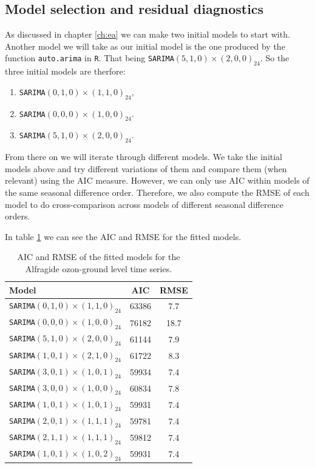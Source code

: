 \documentclass{article}
\begin{document}
\subsection{Model selection and residual diagnostics}

As discussed in chapter \ref{ch:ea} we can make two initial models to start with. Another model we will take as our initial model is the one produced by the function \verb|auto.arima| in \verb|R|. That being 
\verb|SARIMA|$(5,1,0) \times (2,0,0)_{24}$. So the three initial models are therfore:
\begin{enumerate}
    \item \verb|SARIMA|$(0,1,0) \times (1,1,0)_{24}$,
    \item \verb|SARIMA|$(0,0,0) \times (1,0,0)_{24}$.
    \item \verb|SARIMA|$(5,1,0) \times (2,0,0)_{24}$.
\end{enumerate}

From there on we will iterate through different models. We take the initial models above and try different variations of them and compare them (when relevant) using the AIC measure. However, we can only use AIC within models of the same seasonal
difference order. Therefore, we also compute the RMSE of each model to do cross-comparison across models of different seasonal difference orders. 

In table \ref{model:ozon} we can see the AIC and RMSE for the fitted models.

\begin{table}[htbp]
  \centering
  \begin{tabular}{|l|c|c|} \hline
    \textbf{Model} & \textbf{AIC} & \textbf{RMSE} \\  \hline
    \verb|SARIMA|$(0,1,0) \times (1,1,0)_{24}$&  63386 & 7.7 \\ \hline 
    \verb|SARIMA|$(0,0,0) \times (1,0,0)_{24}$  & 76182 & 18.7  \\ \hline
    \verb|SARIMA|$(5,1,0) \times (2,0,0)_{24}$ & 61144 & 7.9  \\ \hline
    \verb|SARIMA|$(1,0,1) \times (2,1,0)_{24}$ & 61722 & 8.3  \\ \hline
    \verb|SARIMA|$(3,0,1) \times (1,0,1)_{24}$ & 59934 & 7.4  \\ \hline
    \verb|SARIMA|$(3,0,0) \times (1,0,0)_{24}$ & 60834 & 7.8  \\ \hline
    \verb|SARIMA|$(1,0,1) \times (1,0,1)_{24}$ & 59931 & 7.4  \\ \hline
    \verb|SARIMA|$(2,0,1) \times (1,1,1)_{24}$ & 59781 & 7.4  \\ \hline
    \verb|SARIMA|$(2,1,1) \times (1,1,1)_{24}$ & 59812 & 7.4  \\ \hline
    \verb|SARIMA|$(1,0,1) \times (1,0,2)_{24}$ & 59931 & 7.4  \\ 
    \hline
  \end{tabular}
  \caption{AIC and RMSE of the fitted models for the Alfragide ozon-ground level time series.}
  \label{model:ozon}
\end{table}
\end{document}
